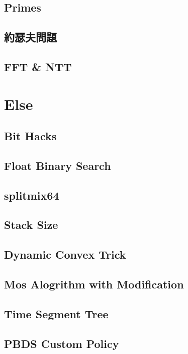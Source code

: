 \subsection{Primes}

\subsection{約瑟夫問題}

\subsection{FFT \& NTT}


\section{Else}
\subsection{Bit Hacks}

\subsection{Float Binary Search}

\subsection{splitmix64}

\subsection{Stack Size}

\subsection{Dynamic Convex Trick}

\subsection{Mos Alogrithm with Modification}

\subsection{Time Segment Tree}

\subsection{PBDS Custom Policy}

